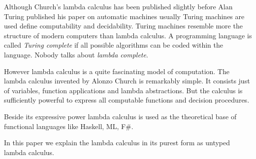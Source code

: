 Although Church's lambda calculus has been published slightly before Alan
Turing published his paper on automatic machines usually Turing machines are
used define computability and decidability. Turing machines resemble more the
structure of modern computers than lambda calculus. A programming language is
called \emph{Turing complete} if all possible algorithms can be coded within
the language. Nobody talks about \emph{lambda complete}.

However lambda calculus is a quite fascinating model of computation.  The
lambda calculus invented by Alonzo Church is remarkably simple. It consists
just of variables, function applications and lambda abstractions. But the
calculus is sufficiently powerful to express all computable functions and
decision procedures.

Beside its expressive power lambda calculus is used as the theoretical base of
functional languages like Haskell, ML, F\#.

In this paper we explain the lambda calculus in its purest form as untyped
lambda calculus.


